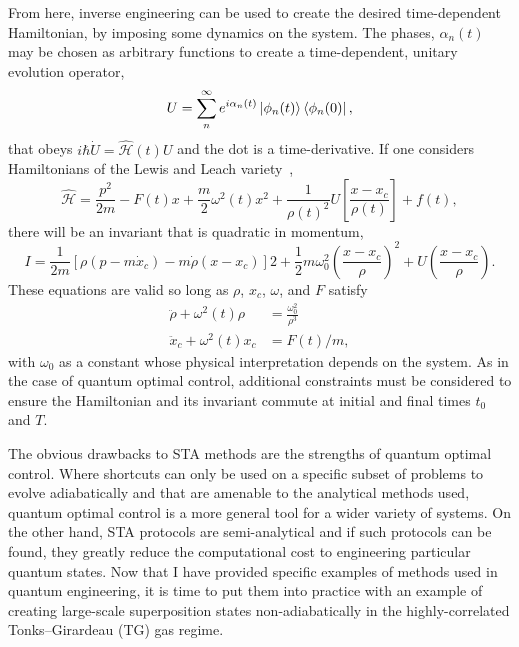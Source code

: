 From here, inverse engineering can be used to create the desired time-dependent Hamiltonian, by imposing some dynamics on the system.
The phases, $\alpha_n(t)$ may be chosen as arbitrary functions to create a time-dependent, unitary evolution operator,
\begin{equation}
U = \sum_n^\infty e^{i\alpha_n(t)}\ket{\phi_n(t)}\bra{\phi_n(0)},
\end{equation}
\noindent that obeys $i\hbar \dot U = \mathcal{\hat H}(t)U$ and the dot is a time-derivative.
If one considers Hamiltonians of the Lewis and Leach variety~\cite{lewis1982},
\begin{equation}
\mathcal{\hat H} = \frac{p^2}{2m}  -F(t)x + \frac{m}{2}\omega^2(t)x^2 + \frac{1}{\rho(t)^2}U\left[\frac{x-x_c}{\rho(t)}\right] + f(t),
\label{eqn:HSTA}
\end{equation}
there will be an invariant that is quadratic in momentum,
\begin{equation}
I = \frac{1}{2m}[\rho(p-m\dot x_c)-m\dot \rho(x-x_c)]2 + \frac{1}{2}m\omega_0^2\left( \frac{x-x_c}{\rho} \right)^2 + U\left( \frac{x-x_c}{\rho}\right).
\end{equation}
\noindent These equations are valid so long as $\rho$, $x_c$, $\omega$, and $F$ satisfy
\begin{align}
\ddot \rho + \omega^2(t)\rho &= \frac{\omega_0^2}{\rho^3} \label{eqn:rho}\\
\ddot x_c + \omega^2(t)x_c &= F(t)/m \label{eqn:xc},
\end{align}
\noindent with $\omega_0$ as a constant whose physical interpretation depends on the system.
As in the case of quantum optimal control, additional constraints must be considered to ensure the Hamiltonian and its invariant commute at initial and final times $t_0$ and $T$.

The obvious drawbacks to STA methods are the strengths of quantum optimal control.
Where shortcuts can only be used on a specific subset of problems to evolve adiabatically and that are amenable to the analytical methods used, quantum optimal control is a more general tool for a wider variety of systems.
On the other hand, STA protocols are semi-analytical and if such protocols can be found, they greatly reduce the computational cost to engineering particular quantum states.
Now that I have provided specific examples of methods used in quantum engineering, it is time to put them into practice with an example of creating large-scale superposition states non-adiabatically in the highly-correlated Tonks--Girardeau (TG) gas regime.

